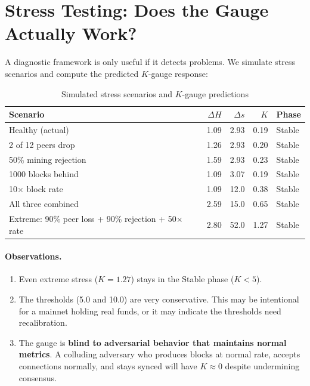 \documentclass[11pt,a4paper]{article}
\begin{document}
\section{Stress Testing: Does the Gauge Actually Work?}
\label{sec:stress}

A diagnostic framework is only useful if it detects problems. We simulate stress scenarios and compute the predicted $K$-gauge response:

\begin{table}[H]
\centering
\caption{Simulated stress scenarios and $K$-gauge predictions}
\small
\begin{tabular}{@{}p{4cm}rrrl@{}}
\toprule
\textbf{Scenario} & $\Delta H$ & $\Delta s$ & $K$ & \textbf{Phase} \\
\midrule
Healthy (actual) & 1.09 & 2.93 & 0.19 & Stable \\
2 of 12 peers drop & 1.26 & 2.93 & 0.20 & Stable \\
50\% mining rejection & 1.59 & 2.93 & 0.23 & Stable \\
1000 blocks behind & 1.09 & 3.07 & 0.19 & Stable \\
10$\times$ block rate & 1.09 & 12.0 & 0.38 & Stable \\
All three combined & 2.59 & 15.0 & 0.65 & Stable \\
Extreme: 90\% peer loss + 90\% rejection + 50$\times$ rate & 2.80 & 52.0 & 1.27 & Stable \\
\bottomrule
\end{tabular}
\end{table}

\paragraph{Observations.}
\begin{enumerate}
    \item Even extreme stress ($K = 1.27$) stays in the Stable phase ($K < 5$).
    \item The thresholds (5.0 and 10.0) are very conservative. This may be intentional for a mainnet holding real funds, or it may indicate the thresholds need recalibration.
    \item The gauge is \textbf{blind to adversarial behavior that maintains normal metrics}. A colluding adversary who produces blocks at normal rate, accepts connections normally, and stays synced will have $K \approx 0$ despite undermining consensus.
\end{enumerate}
\end{document}

